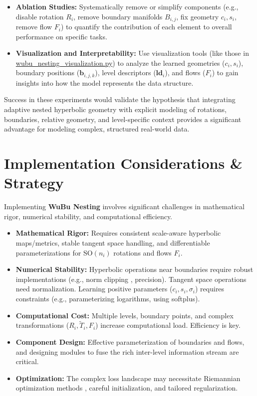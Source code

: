 \documentclass[11pt, twoside]{article} %
\newcommand{\SOcmd}[1]{\text{SO}(#1)} %
\newcommand{\wubu}{\textbf{WuBu Nesting}} %
\begin{document}
\begin{itemize}
    \item \textbf{Ablation Studies:} Systematically remove or simplify components (e.g., disable rotation $R_i$, remove boundary manifolds $B_{i,j}$, fix geometry $c_i, s_i$, remove flow $F_i$) to quantify the contribution of each element to overall performance on specific tasks.
    \item \textbf{Visualization and Interpretability:} Use visualization tools (like those in \url{wubu_nesting_visualization.py}) to analyze the learned geometries ($c_i, s_i$), boundary positions ($\mathbf{b}_{i,j,k}$), level descriptors ($\mathbf{ld}_i$), and flows ($F_i$) to gain insights into how the model represents the data structure.
\end{itemize}

Success in these experiments would validate the hypothesis that integrating adaptive nested hyperbolic geometry with explicit modeling of rotations, boundaries, relative geometry, and level-specific context provides a significant advantage for modeling complex, structured real-world data.

\section{Implementation Considerations \& Strategy}
\label{sec:implementation}

Implementing \wubu{} involves significant challenges in mathematical rigor, numerical stability, and computational efficiency.

\begin{itemize}[leftmargin=*, labelsep=5pt]
    \item \textbf{Mathematical Rigor:} Requires consistent scale-aware hyperbolic maps/metrics, stable tangent space handling, and differentiable parameterizations for $\SOcmd{n_i}$ rotations \cite{MhammediEtAl2017} and flows $F_i$.
    \item \textbf{Numerical Stability:} Hyperbolic operations near boundaries require robust implementations (e.g., norm clipping \cite{LiuHeHan2025}, precision). Tangent space operations need normalization. Learning positive parameters ($c_i, s_i, \sigma_i$) requires constraints (e.g., parameterizing logarithms, using softplus).
    \item \textbf{Computational Cost:} Multiple levels, boundary points, and complex transformations ($R_i, \tilde{T}_i, F_i$) increase computational load. Efficiency is key.
    \item \textbf{Component Design:} Effective parameterization of boundaries and flows, and designing modules to fuse the rich inter-level information stream are critical.
    \item \textbf{Optimization:} The complex loss landscape may necessitate Riemannian optimization methods \cite{BecigneulGanea2019, KochurovEtAl2020}, careful initialization, and tailored regularization.
\end{itemize}
\end{document}

